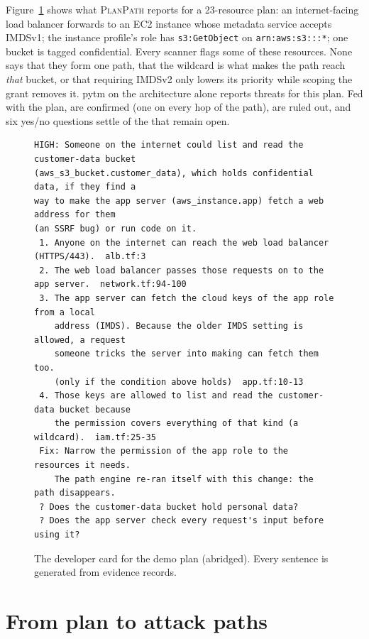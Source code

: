 \documentclass[sigconf,review,anonymous]{acmart}
\newcommand{\sys}{\textsc{PlanPath}\xspace}   %
\begin{document}
Figure~\ref{fig:card} shows what \sys reports for a 23-resource plan: an internet-facing load balancer forwards to an EC2
instance whose metadata service accepts IMDSv1; the instance profile's role has \texttt{s3:GetObject} on
\texttt{arn:aws:s3:::*}; one bucket is tagged confidential. Every scanner flags some of these resources. None says that they
form one path, that the wildcard is what makes the path reach \emph{that} bucket, or that requiring IMDSv2 only lowers its
priority while scoping the grant removes it. pytm on the architecture alone reports \NumDemoGeneric threats for this
plan. Fed with the plan, \NumDemoConfirmed are confirmed (one on every hop of the path), \NumDemoRuledOut are ruled out,
and six yes/no questions settle \NumDemoSixSettle of the \NumDemoOpen that remain open.

\begin{figure}[t]
\begin{lstlisting}
HIGH: Someone on the internet could list and read the customer-data bucket
(aws_s3_bucket.customer_data), which holds confidential data, if they find a
way to make the app server (aws_instance.app) fetch a web address for them
(an SSRF bug) or run code on it.
 1. Anyone on the internet can reach the web load balancer (HTTPS/443).  alb.tf:3
 2. The web load balancer passes those requests on to the app server.  network.tf:94-100
 3. The app server can fetch the cloud keys of the app role from a local
    address (IMDS). Because the older IMDS setting is allowed, a request
    someone tricks the server into making can fetch them too.
    (only if the condition above holds)  app.tf:10-13
 4. Those keys are allowed to list and read the customer-data bucket because
    the permission covers everything of that kind (a wildcard).  iam.tf:25-35
 Fix: Narrow the permission of the app role to the resources it needs.
    The path engine re-ran itself with this change: the path disappears.
 ? Does the customer-data bucket hold personal data?
 ? Does the app server check every request's input before using it?
\end{lstlisting}
\caption{The developer card for the demo plan (abridged). Every sentence is generated from evidence records.}
\label{fig:card}
\end{figure}

\section{From plan to attack paths}\label{sec:paths}
\end{document}
